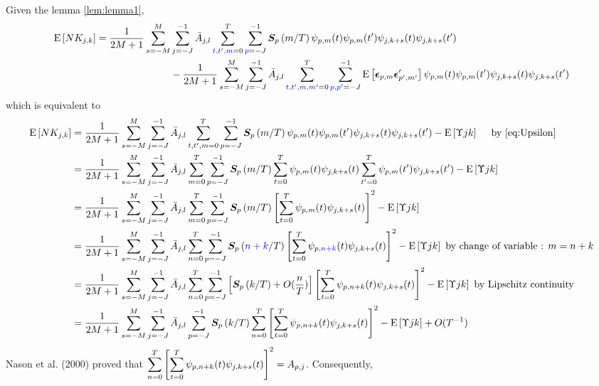 \documentclass[main_document.tex]{subfiles}
\begin{document}
Given the lemma \ref{lem:lemma1}, 
\begin{align*}
	\E{N K_{j,k}} = \frac{\displaystyle 1}{\displaystyle 2M+1}\sum_{s=-M}^{M}& \scalesum{j} \invA{j}{l} \locsum{\textcolor{blue}{t,t',m}} \scalesum{\textcolor{blue}{p}} \CEWS{p}{m}\wavelet{p}{m}{t}\wavelet{p}{m}{t'}\wavelet{j}{k+s}{t}\wavelet{j}{k+s}{t'} \\ 
	&- \frac{\displaystyle 1}{\displaystyle 2M+1}\sum_{s=-M}^{M} \scalesum{j} \invA{j}{l} \locsum{\textcolor{blue}{t,t',m,m'}} \scalesum{\textcolor{blue}{p,p'}} \E{\idioError{p}{m}\idioError{p'}{m'}'}\wavelet{p}{m}{t}\wavelet{p}{m}{t'}\wavelet{j}{k+s}{t}\wavelet{j}{k+s}{t'}
\end{align*}
which is equivalent to
\begin{align*}
		\E{N K_{j,k}} &= \frac{\displaystyle 1}{\displaystyle 2M+1}\sum_{s=-M}^{M} \scalesum{j} \invA{j}{l} \locsum{t,t',m} \scalesum{p} \CEWS{p}{m}\wavelet{p}{m}{t}\wavelet{p}{m}{t'}\wavelet{j}{k+s}{t}\wavelet{j}{k+s}{t'} - \E{\Upsilon{j}{k}} \quad \text{ by } \eqref{eq:Upsilon} \\
					&= \frac{\displaystyle 1}{\displaystyle 2M+1}\sum_{s=-M}^{M} \scalesum{j} \invA{j}{l} \locsum{m} \scalesum{p} \CEWS{p}{m} \locsum{t}\wavelet{p}{m}{t}\wavelet{j}{k+s}{t}\locsum{t'}\wavelet{p}{m}{t'}\wavelet{j}{k+s}{t'} - \E{\Upsilon{j}{k}} \\
					&= \frac{\displaystyle 1}{\displaystyle 2M+1}\sum_{s=-M}^{M} \scalesum{j} \invA{j}{l} \locsum{m} \scalesum{p} \CEWS{p}{m} \left[\locsum{t}\wavelet{p}{m}{t}\wavelet{j}{k+s}{t}\right]^{2} - \E{\Upsilon{j}{k}}\\
					&= \frac{\displaystyle 1}{\displaystyle 2M+1}\sum_{s=-M}^{M} \scalesum{j} \invA{j}{l} \locsum{n} \scalesum{p} \CEWS{p}{\textcolor{blue}{n+k}} \left[\locsum{t}\wavelet{p}{\textcolor{blue}{n+k}}{t}\wavelet{j}{k+s}{t}\right]^{2} - \E{\Upsilon{j}{k}}  \text{ by change of variable : } m=n+k \\
					&= \frac{\displaystyle 1}{\displaystyle 2M+1}\sum_{s=-M}^{M} \scalesum{j} \invA{j}{l} \locsum{n} \scalesum{p} \left[\CEWS{p}{k} + O(\frac{n}{T})\right] \left[\locsum{t}\wavelet{p}{n+k}{t}\wavelet{j}{k+s}{t}\right]^{2} - \E{\Upsilon{j}{k}} \text{ by Lipschitz continuity} \\
					&= \frac{\displaystyle 1}{\displaystyle 2M+1}\sum_{s=-M}^{M} \scalesum{j} \invA{j}{l}  \scalesum{p} \CEWS{p}{k} \locsum{n}\left[\locsum{t}\wavelet{p}{n+k}{t}\wavelet{j}{k+s}{t}\right]^{2} - \E{\Upsilon{j}{k}} + O(T^{-1})
\end{align*}
Nason et al. (2000) proved that $\locsum{n}\left[\locsum{t}\wavelet{p}{n+k}{t}\wavelet{j}{k+s}{t}\right]^{2} = A_{p,j}$. Consequently, 
\end{document}

